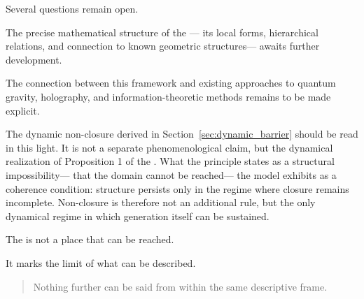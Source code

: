 Several questions remain open.

The precise mathematical structure of the \DH{}---
its local forms,
hierarchical relations,
and connection to known geometric structures---
awaits further development.

The connection between this framework
and existing approaches to quantum gravity,
holography, and information-theoretic methods
remains to be made explicit.

The dynamic non-closure derived in
Section~\ref{sec:dynamic_barrier}
should be read in this light.
It is not a separate phenomenological claim,
but the dynamical realization of Proposition 1
of the \DHP{}.
What the principle states as a structural impossibility---
that the \ungenerated{} domain cannot be reached---
the model exhibits as a coherence condition:
structure persists only in the regime where closure remains incomplete.
Non-closure is therefore not an additional rule,
but the only dynamical regime in which generation itself
can be sustained.

The \DH{} is not a place that can be reached.

It marks the limit
of what can be described.

\medskip
\begin{quote}
Nothing further can be said from within the same descriptive frame.
\end{quote}
